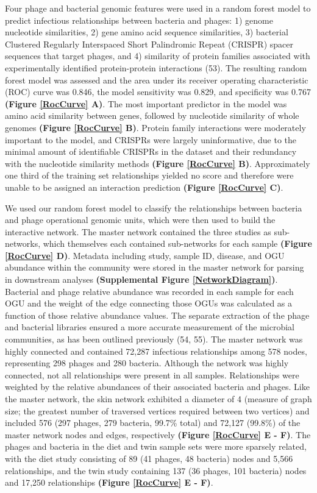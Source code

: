 \documentclass[12pt,]{article}
\begin{document}
Four phage and bacterial genomic features were used in a random forest
model to predict infectious relationships between bacteria and phages:
1) genome nucleotide similarities, 2) gene amino acid sequence
similarities, 3) bacterial Clustered Regularly Interspaced Short
Palindromic Repeat (CRISPR) spacer sequences that target phages, and 4)
similarity of protein families associated with experimentally identified
protein-protein interactions (53). The resulting random forest model was
assessed and the area under its receiver operating characteristic (ROC)
curve was 0.846, the model sensitivity was 0.829, and specificity was
0.767 \textbf{(Figure \ref{RocCurve} A)}. The most important predictor
in the model was amino acid similarity between genes, followed by
nucleotide similarity of whole genomes \textbf{(Figure \ref{RocCurve}
B)}. Protein family interactions were moderately important to the model,
and CRISPRs were largely uninformative, due to the minimal amount of
identifiable CRISPRs in the dataset and their redundancy with the
nucleotide similarity methods \textbf{(Figure \ref{RocCurve} B)}.
Approximately one third of the training set relationships yielded no
score and therefore were unable to be assigned an interaction prediction
\textbf{(Figure \ref{RocCurve} C)}.

We used our random forest model to classify the relationships between
bacteria and phage operational genomic units, which were then used to
build the interactive network. The master network contained the three
studies as sub-networks, which themselves each contained sub-networks
for each sample \textbf{(Figure \ref{RocCurve} D)}. Metadata including
study, sample ID, disease, and OGU abundance within the community were
stored in the master network for parsing in downstream analyses
\textbf{(Supplemental Figure \ref{NetworkDiagram})}. Bacterial and phage
relative abundance was recorded in each sample for each OGU and the
weight of the edge connecting those OGUs was calculated as a function of
those relative abundance values. The separate extraction of the phage
and bacterial libraries ensured a more accurate measurement of the
microbial communities, as has been outlined previously (54, 55). The
master network was highly connected and contained 72,287 infectious
relationships among 578 nodes, representing 298 phages and 280 bacteria.
Although the network was highly connected, not all relationships were
present in all samples. Relationships were weighted by the relative
abundances of their associated bacteria and phages. Like the master
network, the skin network exhibited a diameter of 4 (measure of graph
size; the greatest number of traversed vertices required between two
vertices) and included 576 (297 phages, 279 bacteria, 99.7\% total) and
72,127 (99.8\%) of the master network nodes and edges, respectively
\textbf{(Figure \ref{RocCurve} E - F)}. The phages and bacteria in the
diet and twin sample sets were more sparsely related, with the diet
study consisting of 89 (41 phages, 48 bacteria) nodes and 5,566
relationships, and the twin study containing 137 (36 phages, 101
bacteria) nodes and 17,250 relationships \textbf{(Figure \ref{RocCurve}
E - F)}.
\end{document}
